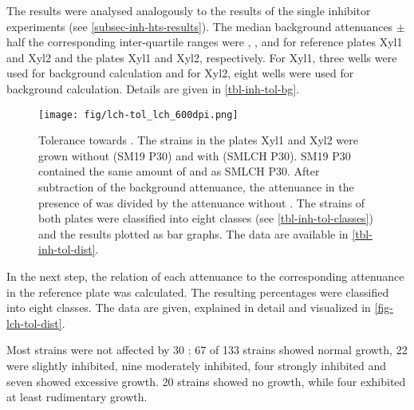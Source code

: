 The results were analysed analogously to the results of the single inhibitor experiments (see \vref{subsec-inh-hts-results}). The median background attenuances $\pm$ half the corresponding inter-quartile ranges were , ,  and  for reference plates Xyl1 and Xyl2 and the \lch{} plates Xyl1 and Xyl2, respectively. For Xyl1, three wells were used for background calculation and for Xyl2, eight wells were used for background calculation. Details are given in \vref{tbl-inh-tol-bg}.

\begin{figure}
	\begin{center}
		\texttt{[image: fig/lch-tol\_lch\_600dpi.png]}
		\caption[Tolerance Towards \LCH{}]{Tolerance towards \lch{}. The strains in the plates Xyl1 and Xyl2 were grown without \lch{} (SM19 P30) and with \lch{} (SMLCH P30). SM19 P30 contained the same amount of \glc{} and \xyl{} as SMLCH P30. After subtraction of the background attenuance, the attenuance in the presence of \lch{} was divided by the attenuance without \lch{}. The strains of both plates were classified into eight classes (see \vref{tbl-inh-tol-classes}) and the results plotted as bar graphs. The data are available in \vref{tbl-inh-tol-dist}.\label{fig-lch-tol-dist}}
	\end{center}
\end{figure}

In the next step, the relation of each attenuance to the corresponding attenuance in the reference plate was calculated. The resulting percentages were classified into eight classes. The data are given, explained in detail and visualized in \vref{fig-lch-tol-dist}.

Most strains were not affected by \SI{30}{\volpercent} \lch{}: 67 of 133 strains showed normal growth, 22 were slightly inhibited, nine moderately inhibited, four strongly inhibited and seven showed excessive growth. 20 strains showed no growth, while four exhibited at least rudimentary growth.

